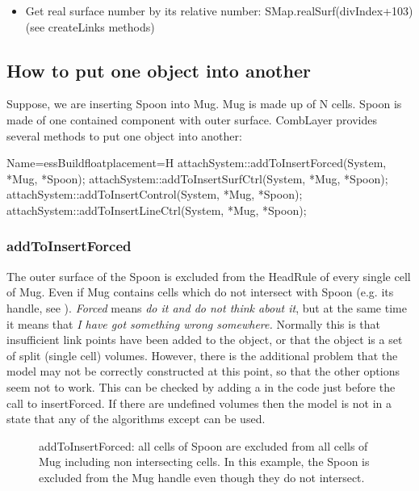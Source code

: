 \begin{itemize}
\item Get real surface number by its relative number: SMap.realSurf(divIndex+103) (see createLinks methods)
\end{itemize}

\subsection{How to put one object into another}

Suppose, we are inserting Spoon into Mug.
Mug is made up of N cells. Spoon is made of one contained component with outer surface.
CombLayer provides several methods to put one object into another:

\begin{cpp}{Name=essBuild}{floatplacement=H}
attachSystem::addToInsertForced(System,   *Mug, *Spoon);
attachSystem::addToInsertSurfCtrl(System, *Mug, *Spoon);
attachSystem::addToInsertControl(System,  *Mug, *Spoon);
attachSystem::addToInsertLineCtrl(System, *Mug, *Spoon);
\end{cpp}

\subsubsection{addToInsertForced}

The outer surface of the Spoon is excluded from the HeadRule of every single cell of Mug.
Even if Mug contains cells which do not intersect with Spoon (e.g. its handle, see ).
{\it Forced} means {\it do it and do not think about it}, but at the same time it means that
{\it I have got something wrong somewhere.}  Normally this is that insufficient link points have been added
to the object, or that the object is a set of split (single cell) volumes.  However, there is the additional
problem that the model may not be correctly constructed at this point, so that the other options seem not to work.
This can be checked by adding a
in the code just before the call to insertForced. If there are undefined volumes then the model is not in a state that
any of the  algorithms except  can be used. 

\begin{figure}
  \centering
  \caption{addToInsertForced: all cells of Spoon are excluded from all cells of Mug including non intersecting cells. In this example, the Spoon is excluded from the Mug handle even though
  they do not intersect.}
  \label{fig:forced}
\end{figure}


